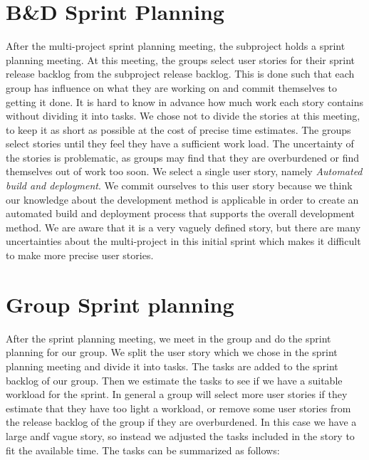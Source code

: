 \section{B\&D Sprint Planning}
After the multi-project sprint planning meeting, the \bd subproject holds a sprint planning meeting. At this meeting, the \bd groups select user stories for their sprint release backlog from the \bd subproject release backlog. This is done such that each group has influence on what they are working on and commit themselves to getting it done. It is hard to know in advance how much work each story contains without dividing it into tasks. We chose not to divide the stories at this meeting, to keep it as short as possible at the cost of precise time estimates. The groups select stories until they feel they have a sufficient work load. The uncertainty of the stories is problematic, as groups may find that they are overburdened or find themselves out of work too soon. We select a single user story, namely \emph{Automated build and deployment}. We commit ourselves to this user story because we think our knowledge about the development method is applicable in order to create an automated build and deployment process that supports the overall development method. We are aware that it is a very vaguely defined story, but there are many uncertainties about the multi-project in this initial sprint which makes it difficult to make more precise user stories.

\section{Group Sprint planning}\label{sec:group_sprint_planning}
After the \bd sprint planning meeting, we meet in the group and do the sprint planning for our group. We split the user story which we chose in the \bd sprint planning meeting and divide it into tasks. The tasks are added to the sprint backlog of our group. Then we estimate the tasks to see if we have a suitable workload for the sprint. In general a group will select more user stories if they estimate that they have too light a workload, or remove some user stories from the release backlog of the group if they are overburdened. In this case we have a large andf vague story, so instead we adjusted the tasks included in the story to fit the available time. The tasks can be summarized as follows: 

